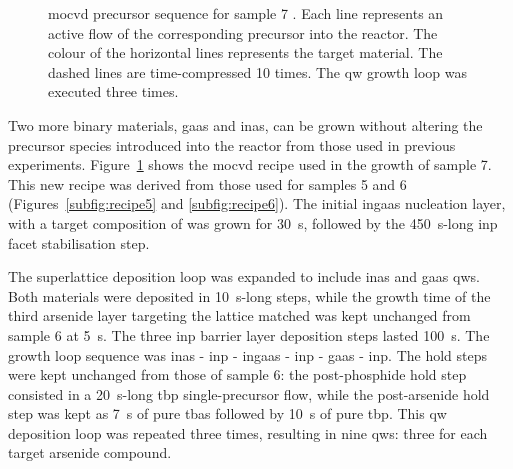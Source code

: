 \begin{figure}
    \caption[\acs{mocvd} precursor sequence for sample 7.]{\acs{mocvd} precursor sequence for sample 7 \cite{Brugnolotto2023_2}. Each line represents an active flow of the corresponding precursor into the reactor. The colour of the horizontal lines represents the target material. The dashed lines are time-compressed \num{10} times. The \acl{qw} growth loop was executed three times.}
    \label{subfig:recipe7}
\end{figure}


Two more binary materials, \acf{gaas} and \acf{inas}, can be grown without altering the precursor species introduced into the reactor from those used in previous experiments. Figure~\ref{subfig:recipe7} shows the \acs{mocvd} recipe used in the growth of sample 7. This new recipe was derived from those used for samples 5 and 6 (Figures~\ref{subfig:recipe5} and \ref{subfig:recipe6}). The initial \acs{ingaas} nucleation layer, with a target composition of  was grown for \qty{30}{\second}, followed by the \qty{450}{\second}-long \acs{inp}  facet stabilisation step.

The superlattice deposition loop was expanded to include \acs{inas} and \acs{gaas} \acl{qw}s. Both materials were deposited in \qty{10}{\second}-long steps, while the growth time of the third arsenide layer targeting the lattice matched  was kept unchanged from sam\-ple 6 at \qty{5}{\second}. The three \acs{inp} barrier layer deposition steps lasted \qty{100}{\second}. The growth loop sequence was \acs{inas} - \acs{inp} - \acs{ingaas} - \acs{inp} - \acs{gaas} - \acs{inp}. The hold steps were kept unchanged from those of sample 6: the post-phosphide hold step consisted in a \qty{20}{\second}-long \acf{tbp} single-precursor flow, while the post-arsenide hold step was kept as \qty{7}{\second} of pure \acf{tbas} followed by \qty{10}{\second} of pure \acs{tbp}. This \acl{qw} deposition loop was repeated three times, resulting in nine \acl{qw}s: three for each target arsenide compound.

